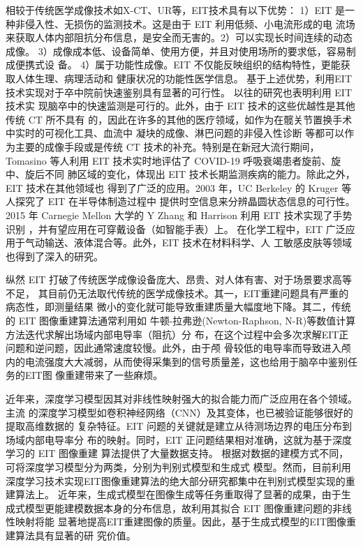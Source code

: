 相较于传统医学成像技术如X-CT、UR等，EIT技术具有以下优势：
1）EIT 是一种非侵入性、无损伤的监测技术。这是由于 EIT 利用低频、小电流形成的电
流场来获取人体内部阻抗分布信息，是安全而无害的。2）可以实现长时间连续的动态成像。
3）成像成本低、设备简单、使用方便，并且对使用场所的要求低，容易制成便携式设
  备。
4）属于功能性成像。EIT 不仅能反映组织的结构特性，更能获取人体生理、病理活动和
  健康状况的功能性医学信息。
基于上述优势，利用EIT技术实现对于卒中院前快速鉴别具有显著的可行性。
以往的研究\cite{8936983}\cite{2023Applied}\cite{Acosd}也表明利用 EIT 技术实
现脑卒中的快速监测是可行的。此外，由于 EIT 技术的这些优越性是其他传统 CT 所不具有
的，因此在许多的其他的医疗领域，如作为在髋关节置换手术中实时的可视化工具、血流中
凝块的成像、淋巴问题的非侵入性诊断\cite{2018MAET}
等都可以作为主要的成像手段或是传统 CT 技术的补充。特别是在新冠大流行期间，
Tomasino 等人利用 EIT 技术实时地评估了 COVID-19 呼吸衰竭患者旋前、旋中、旋后不同
肺区域的变化\cite{articleTSS}，体现出 EIT 技术长期监测疾病的能力。除此之外，EIT 技术在其他领域也
得到了广泛的应用。2003 年，UC Berkeley 的 Kruger 等人探究了 EIT 在半导体制造过程中
提供时空信息来分辨晶圆状态信息的可行性\cite{2003Tomography}。2015 年 Carnegie Mellon 大学的 Y Zhang 和
Harrison 利用 EIT 技术实现了手势识别 \cite{CMU2015}，并有望应用在可穿戴设备（如智能手表）上。
在化学工程中，EIT 广泛应用于气动输送、液体混合等。\cite{2003Chemical}此外，EIT 技术在材料科学\cite{2007CBEIT}、人
工敏感皮肤\cite{2020Artificial}等领域也得到了深入的研究。

纵然 EIT 打破了传统医学成像设备庞大、昂贵、对人体有害、对于场景要求高等不足，
其目前仍无法取代传统的医学成像技术。其一，EIT重建问题具有严重的病态性，即测量结果
微小的变化就可能导致重建质量大幅度地下降。其二，传统的 EIT 图像重建算法通常利用如
牛顿-拉弗逊(Newton-Raphson, N-R)等数值计算方法迭代求解出场域内部电导率（阻抗）分
布，在这个过程中会多次求解EIT正问题和逆问题，因此通常速度较慢。此外，由于颅
骨较低的电导率而导致进入颅内的电流强度大大减弱，从而使得采集到的信号质量差，这也给用于脑卒中鉴别任务的EIT图
像重建带来了一些麻烦。

近年来，深度学习模型因其对非线性映射强大的拟合能力而广泛应用在各个领域。主流
的深度学习模型如卷积神经网络（CNN）及其变体，也已被验证能够很好的提取高维数据的
复杂特征\cite{Yann2015Deep}。EIT 问题的关键就是建立从待测场边界的电压分布到场域内部电导率分
布的映射。同时，EIT 正问题结果相对准确，这就为基于深度学习的 EIT 图像重建
算法提供了大量数据支持。
根据对数据的建模方式不同，可将深度学习模型分为两类，分别为判别式模型和生成式
模型。然而，目前利用深度学习技术实现EIT图像重建算法的绝大部分研究都集中在判别式模型实现的重建算法上。
近年来，生成式模型在图像生成等任务重取得了显著的成果，由于生
成式模型更能建模数据本身的分布信息，故利用其拟合 EIT 图像重建问题的非线性映射将能
显著地提高EIT重建图像的质量。因此，基于生成式模型的EIT图像重建算法具有显著的研
究价值。


